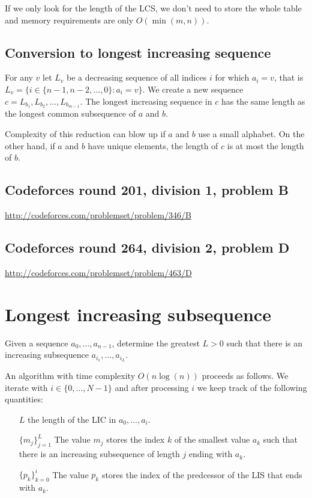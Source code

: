 \documentclass[a4paper, twoside,openany]{book}
\newcommand{\insertcode}[2]{\begin{itemize}\item[]\end{itemize}} %
\begin{document}
\insertcode{"codes/longest_common_subsequence.cpp"}{A dynanamic programming approach to the LCS problem with LCS reconstruction.}

If we only look for the length of the LCS, we don't need to store the whole table and memory requirements are only $O(\min(m,n))$.

\insertcode{"codes/longest_common_subsequence_length.cpp"}{A dynanamic programming approac to find the length of the LCS.}

\subsection{Conversion to longest increasing sequence}
For any $v$ let $L_v$  be a decreasing sequence of all indices $i$ for which $a_i = v$, that is $L_v= \{ i\in \{n-1, n-2, \ldots, 0\} : a_i = v \}$. We create a new sequence $c = L_{b_1}, L_{b_2}, \ldots, L_{b_{m-1}}$. The longest increasing sequence in $c$ has the same length as the longest common subsequence of $a$ and $b$.

Complexity of this reduction can blow up if $a$ and $b$ use a small alphabet. On the other hand, if $a$ and $b$ have unique elements, the length of $c$ is at most the length of $b$.

\subsection{Codeforces round 201, division 1, problem B}
\url{http://codeforces.com/problemset/problem/346/B}

\subsection{Codeforces round 264, division 2, problem D}
\url{http://codeforces.com/problemset/problem/463/D}

\section{Longest increasing subsequence}
Given a sequence $a_0, \ldots, a_{n-1}$, determine the greatest $L>0$ such that there is an  increasing subsequence $a_{i_1}, \ldots, a_{i_L}$.

An algorithm with time complexity $O(n \log(n))$ proceeds as follows. We iterate with $i\in \{0, \ldots, N-1\}$ and after processing $i$ we keep track of the following quantities:
\begin{enumerate}
\item[$L$] the length of the LIC in $a_0, \ldots, a_{i}$.
\item[$\{ m_j \}_{j=1}^L$] The value $m_j$ stores the index $k$ of the smallest value $a_k$ such that there is an increasing subsequence of length $j$ ending with $a_k$. 
\item[$\{ p_k \}_{k=0}^i$] The value $p_k$ stores the index of the predcessor of the LIS that ends with $a_k$.
\end{enumerate}
\end{document}
